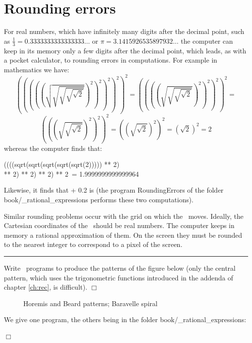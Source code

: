 \section{Rounding errors}
For real numbers, which have infinitely many digits after the decimal point, such as
$\frac{1}{3} = 0.3333333333333333\ldots$ or $\pi = 3.1415926535897932\ldots$
the computer can keep in its memory only a few digits after the decimal point, which
leads, as with a pocket calculator, to rounding errors in computations. For
example in ma\-the\-ma\-tics we have:
\[\left(\left(\left(\left(\left(\sqrt{\sqrt{\sqrt{\sqrt{\sqrt{2}}}}}\right)^{2}\right)^{2}\right)^{2}\right)^{2}\right)^{2} =
\left(\left(\left(\left(\sqrt{\sqrt{\sqrt{\sqrt{2}}}}\right)^{2}\right)^{2}\right)^{2}\right)^{2} =
\] \[\left(\left(\left(\sqrt{\sqrt{\sqrt{2}}}\right)^{2}\right)^{2}\right)^{2} =
\left(\left(\sqrt{\sqrt{2}}\right)^{2}\right)^{2} =
\left(\sqrt{2}\right)^{2} =
2\]
whereas the computer finds that:
\begin{center}
{\idt ((((sqrt(sqrt(sqrt(sqrt(sqrt(2))))) ** 2)\hspace*{6em}}\\
{\idt \hspace*{6em}** 2) ** 2) ** 2) ** 2\ = 1.9999999999999964}
\end{center}

\noindent Likewise, it finds that { + 0.2} is
{} (the program {\idt RoundingErrors} of the folder
{\idt book/\_\allowbreak rational\_\allowbreak expressions} performs these two computations).

\noindent  Similar rounding problems occur with the grid on which the \robot\ moves. Ideally,
the Cartesian coordinates of the \robot\ should be real numbers.
The computer keeps in memory a rational approximation of them. On the screen they must
be rounded to the nearest integer to correspond to a pixel of the screen.

\noindent \rule{137mm}{0.1mm}\par\nopagebreak %
\begin{exercice}{Write \python\ programs to produce the patterns of the figure
below (only the central pattern, which uses the trig\-o\-no\-met\-ric func\-tions in\-tro\-duced
in the addenda of chapter \ref{ch:rec}, is difficult).
\noindent $\Box$}\end{exercice}
\begin{figure}[htbp]
 \caption{Horemis and Beard patterns; Baravelle spiral}\label{fig:beard}
\end{figure}
\vfill
\begin{corrige}{
We give one program, the others being in the folder
{\idt book/\_\allowbreak rational\_\allowbreak expressions}:
\label{prog:CarresImbriquesPeints}

\noindent $\Box$}\end{corrige}

